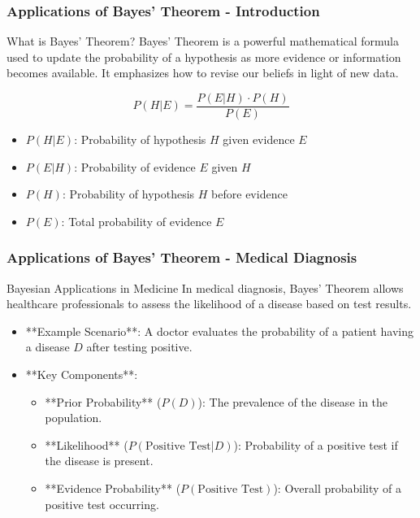 \documentclass[aspectratio=169]{beamer}
\begin{document}
\begin{frame}[fragile]
    \frametitle{Applications of Bayes' Theorem - Introduction}
    \begin{block}{What is Bayes' Theorem?}
        Bayes' Theorem is a powerful mathematical formula used to update the probability of a hypothesis as more evidence or information becomes available. It emphasizes how to revise our beliefs in light of new data.
    \end{block}
    \begin{equation}
        P(H|E) = \frac{P(E|H) \cdot P(H)}{P(E)}
    \end{equation}
    \begin{itemize}
        \item \(P(H|E)\): Probability of hypothesis \(H\) given evidence \(E\)
        \item \(P(E|H)\): Probability of evidence \(E\) given \(H\)
        \item \(P(H)\): Probability of hypothesis \(H\) before evidence
        \item \(P(E)\): Total probability of evidence \(E\)
    \end{itemize}
\end{frame}

\begin{frame}[fragile]
    \frametitle{Applications of Bayes' Theorem - Medical Diagnosis}
    \begin{block}{Bayesian Applications in Medicine}
        In medical diagnosis, Bayes' Theorem allows healthcare professionals to assess the likelihood of a disease based on test results.
    \end{block}
    \begin{itemize}
        \item **Example Scenario**: A doctor evaluates the probability of a patient having a disease \(D\) after testing positive.
        \item **Key Components**:
            \begin{itemize}
                \item **Prior Probability** (\(P(D)\)): The prevalence of the disease in the population.
                \item **Likelihood** (\(P(\text{Positive Test} | D)\)): Probability of a positive test if the disease is present.
                \item **Evidence Probability** (\(P(\text{Positive Test})\)): Overall probability of a positive test occurring.
            \end{itemize}
    \end{itemize}
\end{frame}
\end{document}
